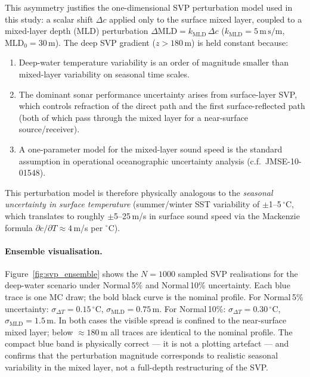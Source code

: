 \documentclass[11pt,a4paper]{article}
\begin{document}
This asymmetry justifies the one-dimensional SVP perturbation model used in this study:
a scalar shift $\Delta c$ applied only to the surface mixed layer,
coupled to a mixed-layer depth (MLD) perturbation
$\Delta\mathrm{MLD} = k_{\mathrm{MLD}}\,\Delta c$
($k_{\mathrm{MLD}} = 5\,\mathrm{m\,s}/\mathrm{m}$, $\mathrm{MLD}_0 = 30\,\mathrm{m}$).
The deep SVP gradient ($z > 180\,\mathrm{m}$) is held constant because:
\begin{enumerate}
  \item Deep-water temperature variability is an order of magnitude smaller than
        mixed-layer variability on seasonal time scales.
  \item The dominant sonar performance uncertainty arises from surface-layer SVP,
        which controls refraction of the direct path and the first surface-reflected
        path (both of which pass through the mixed layer for a near-surface source/receiver).
  \item A one-parameter model for the mixed-layer sound speed is the standard assumption
        in operational oceanographic uncertainty analysis (c.f.\ JMSE-10-01548).
\end{enumerate}
This perturbation model is therefore physically analogous to the \emph{seasonal uncertainty
in surface temperature} (summer/winter SST variability of $\pm$1--5\,$^\circ\mathrm{C}$,
which translates to roughly $\pm$5--25\,m/s in surface sound speed via the Mackenzie
formula $\partial c/\partial T \approx 4$\,m/s per $^\circ$C).

\paragraph{Ensemble visualisation.}
Figure~\ref{fig:svp_ensemble} shows the $N=1000$ sampled SVP realisations for the
deep-water scenario under Normal\,5\% and Normal\,10\% uncertainty.
Each blue trace is one MC draw; the bold black curve is the nominal profile.
For Normal\,5\% uncertainty: $\sigma_{\Delta T}=0.15\,^\circ\mathrm{C}$,
$\sigma_{\mathrm{MLD}}=0.75\,\mathrm{m}$.
For Normal\,10\%: $\sigma_{\Delta T}=0.30\,^\circ\mathrm{C}$,
$\sigma_{\mathrm{MLD}}=1.5\,\mathrm{m}$.
In both cases the visible spread is confined to the near-surface mixed layer;
below $\approx 180\,\mathrm{m}$ all traces are identical to the nominal profile.
The compact blue band is physically correct — it is not a plotting artefact — and
confirms that the perturbation magnitude corresponds to realistic seasonal variability
in the mixed layer, not a full-depth restructuring of the SVP.
\end{document}
